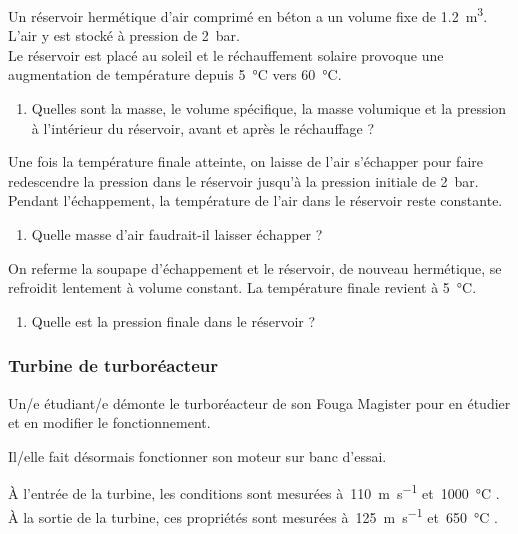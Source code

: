	Un réservoir hermétique d’air comprimé en béton a un volume fixe de \SI{1,2}{\metre\cubed}. L’air y est stocké à pression de \SI{2}{\bar}. \\
	Le réservoir est placé au soleil et le réchauffement solaire provoque une augmentation de température depuis \SI{5}{\degreeCelsius} vers \SI{60}{\degreeCelsius}.
	
	\begin{enumerate}
		\item Quelles sont la masse, le volume spécifique, la masse volumique et la pression à l’intérieur du réservoir, avant et après le réchauffage ?
	\end{enumerate}

	Une fois la température finale atteinte, on laisse de l’air s’échapper pour faire redescendre la pression dans le réservoir jusqu’à la pression initiale de \SI{2}{\bar}. Pendant l’échappement, la température de l’air dans le réservoir reste constante.

	\begin{enumerate}
		\item Quelle masse d’air faudrait-il laisser échapper ?
	\end{enumerate}

	On referme la soupape d’échappement et le réservoir, de nouveau hermétique, se refroidit lentement à volume constant. La température finale revient à \SI{5}{\degreeCelsius}.
	
	\begin{enumerate}
		\item Quelle est la pression finale dans le réservoir ?
	\end{enumerate}


\subsubsection{Turbine de turboréacteur}

	\wherefrom{[DS n°2 2011, 3pts]}
	
	Un/e étudiant/e démonte le turboréacteur de son Fouga Magister pour en étudier et en modifier le fonctionnement.

	Il/elle fait désormais fonctionner son moteur sur banc d’essai.
	
	À l’entrée de la turbine, les conditions sont mesurées à~\SI{110}{\metre\per\second} et~\SI{1000 }{\degreeCelsius} .
	À la sortie de la turbine, ces propriétés sont mesurées à~\SI{125}{\metre\per\second} et~\SI{650}{\degreeCelsius} .
	
